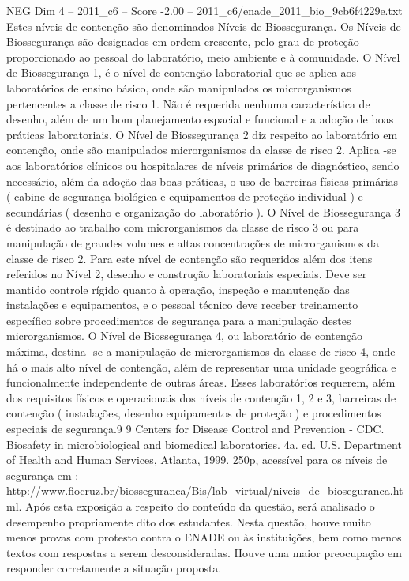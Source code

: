 \begin{textsample}{NEG Dim 4 – 2011\_c6 – Score -2.00 – 2011\_c6/enade\_2011\_bio\_9cb6f4229e.txt}
Estes níveis de contenção são denominados Níveis de Biossegurança.
Os Níveis de Biossegurança são designados em ordem crescente, pelo grau de proteção proporcionado ao pessoal do laboratório, meio ambiente e à comunidade.
O Nível de Biossegurança 1, é o nível de contenção laboratorial que se aplica aos laboratórios de ensino básico, onde são manipulados os microrganismos pertencentes a classe de risco 1.
Não é requerida nenhuma característica de desenho, além de um bom planejamento espacial e funcional e a adoção de boas práticas laboratoriais.
O Nível de Biossegurança 2 diz respeito ao laboratório em contenção, onde são manipulados microrganismos da classe de risco 2.
Aplica -se aos laboratórios clínicos ou hospitalares de níveis primários de diagnóstico, sendo necessário, além da adoção das boas práticas, o uso de barreiras físicas primárias ( cabine de segurança biológica e equipamentos de proteção individual ) e secundárias ( desenho e organização do laboratório ).
O Nível de Biossegurança 3 é destinado ao trabalho com microrganismos da classe de risco 3 ou para manipulação de grandes volumes e altas concentrações de microrganismos da classe de risco 2.
Para este nível de contenção são requeridos além dos itens referidos no Nível 2, desenho e construção laboratoriais especiais.
Deve ser mantido controle rígido quanto à operação, inspeção e manutenção das instalações e equipamentos, e o pessoal técnico deve receber treinamento específico sobre procedimentos de segurança para a manipulação destes microrganismos.
O Nível de Biossegurança 4, ou laboratório de contenção máxima, destina -se a manipulação de microrganismos da classe de risco 4, onde há o mais alto nível de contenção, além de representar uma unidade geográfica e funcionalmente independente de outras áreas.
Esses laboratórios requerem, além dos requisitos físicos e operacionais dos níveis de contenção 1, 2 e 3, barreiras de contenção ( instalações, desenho equipamentos de proteção ) e procedimentos especiais de segurança.9 9 Centers for Disease Control and Prevention - CDC.
Biosafety in microbiological and biomedical laboratories. 4a. ed.
U.S.
Department of Health and Human Services, Atlanta, 1999. 250p, acessível para os níveis de segurança em : http://www.fiocruz.br/biosseguranca/Bis/lab\_virtual/niveis\_de\_bioseguranca.html.
Após esta exposição a respeito do conteúdo da questão, será analisado o desempenho propriamente dito dos estudantes.
Nesta questão, houve muito menos provas com protesto contra o ENADE ou às instituições, bem como menos textos com respostas a serem desconsideradas.
Houve uma maior preocupação em responder corretamente a situação proposta.

\end{textsample}
